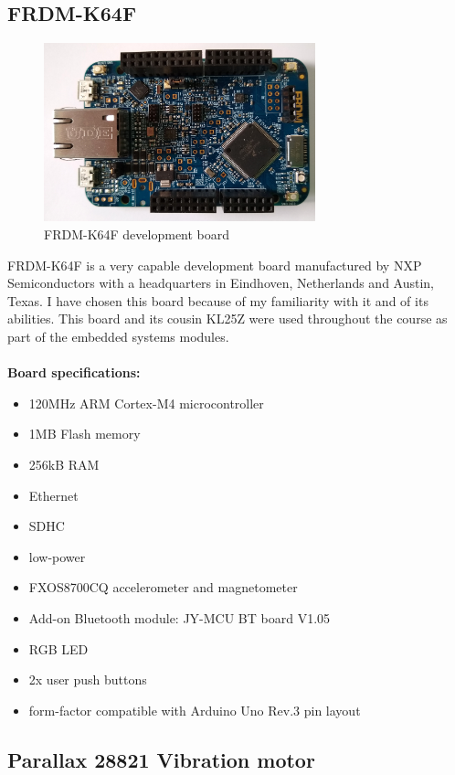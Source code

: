 \documentclass[12pt,a4paper]{article}
\begin{document}
		\subsection{FRDM-K64F}
		\begin{figure}[h]
			\centering
			\includegraphics[width=0.7\textwidth]{k64f1.jpg}\par\vspace{0cm}
			\caption{FRDM-K64F development board}
		\end{figure}
		FRDM-K64F is a very capable development board manufactured by NXP Semiconductors with a 
		headquarters in Eindhoven, Netherlands and Austin, Texas. I have chosen this board because  
		of my familiarity with it and of its abilities. This board and its cousin KL25Z were used  
		throughout the course as part of the embedded systems modules.\\  	
		\\
		{\bfseries Board specifications:}  	
		\begin{itemize}
			\item 120MHz ARM Cortex-M4 microcontroller
			\item 1MB Flash memory
			\item 256kB RAM
			\item Ethernet
			\item SDHC
			\item low-power
			\item FXOS8700CQ accelerometer and magnetometer 
			\item Add-on Bluetooth module: JY-MCU BT board V1.05
			\item RGB LED
			\item 2x user push buttons
			\item form-factor compatible with Arduino Uno Rev.3 pin layout
		\end{itemize}
		
		\subsection{Parallax 28821 Vibration motor}
		
\end{document}

